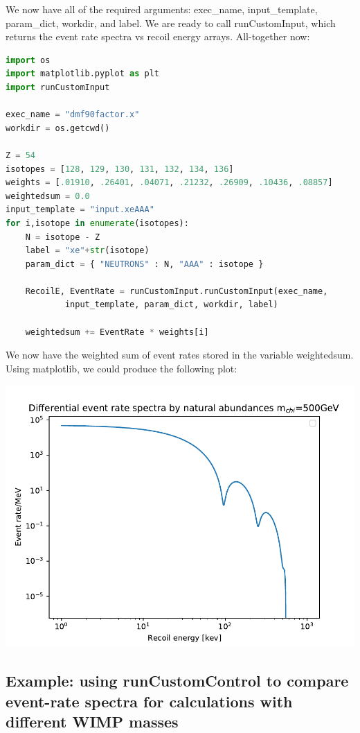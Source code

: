 \documentclass[11pt]{article}
\begin{document}
We now have all of the required arguments: exec\_name, input\_template,
param\_dict, workdir, and label. We are ready to call runCustomInput, which
returns the event rate spectra vs recoil energy arrays. All-together now:
\begin{lstlisting}[language=python]
import os
import matplotlib.pyplot as plt
import runCustomInput

exec_name = "dmf90factor.x"
workdir = os.getcwd()

Z = 54
isotopes = [128, 129, 130, 131, 132, 134, 136]
weights = [.01910, .26401, .04071, .21232, .26909, .10436, .08857]
weightedsum = 0.0
input_template = "input.xeAAA"
for i,isotope in enumerate(isotopes):
    N = isotope - Z
    label = "xe"+str(isotope)
    param_dict = { "NEUTRONS" : N, "AAA" : isotope }

    RecoilE, EventRate = runCustomInput.runCustomInput(exec_name,
            input_template, param_dict, workdir, label)

    weightedsum += EventRate * weights[i]    
\end{lstlisting}
We now have the weighted sum of event rates stored in the variable weightedsum.
Using matplotlib, we could produce the following plot:

{
	\centering
\includegraphics[width=\textwidth]{weightedspectra.pdf}

}

\subsection{Example: using runCustomControl to compare event-rate spectra for
calculations with different WIMP masses}
\end{document}
